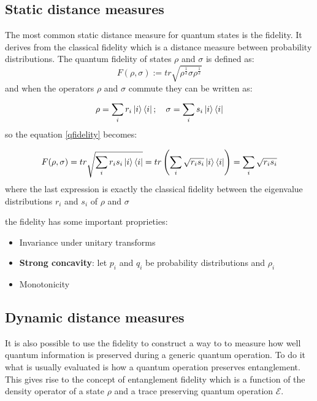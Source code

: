 \documentclass{article}
\begin{document}
\subsection{Static distance measures}


The most common static distance measure for quantum states is the fidelity.
It derives from the classical fidelity which is a distance measure between
probability distributions.
The quantum fidelity of states $\rho$ and $\sigma$ is defined as:
\begin{equation}
	F(\rho,\sigma):=tr \sqrt{\rho^\frac{1}{2}\sigma\rho^\frac{1}{2}}
	\label{qfidelity}
\end{equation}
and when the operators $\rho$ and $\sigma$ commute they can be written as:

\begin {equation}
\rho = \sum_{i} r_i\ket{i}\bra{i}; \hspace{10pt} \sigma = \sum_{i} s_i \ket{i}\bra{i}
\end {equation}
so the equation \ref{qfidelity} becomes:

\begin{equation}
	F(\rho,\sigma) = tr \sqrt{\sum_{i} r_i s_i \ket{i}\bra{i} } = tr \left( \sum_{i} \sqrt{r_i s_i} \ket{i}\bra{i}
	\right) = \sum_{i}\sqrt{r_i s_i}
\end{equation}
where the last expression is exactly the classical fidelity between the eigenvalue
distributions $r_i$ and $s_i$ of $\rho$ and $\sigma$

the fidelity has some important proprieties:
\begin{itemize}
	\item Invariance under unitary transforms
	\item \textbf{Strong concavity}: let $p_i$ and $q_i$ be probability distributions
	      and $\rho_i$
	\item Monotonicity
\end{itemize}
\subsection{Dynamic distance measures}

It is also possible to use the fidelity to construct a way to to measure how
well quantum information is preserved during a generic quantum operation.
To do it what is usually evaluated is how a quantum operation preserves
entanglement.
This gives rise to the concept of entanglement fidelity which is a function
of the density operator of a state $\rho$ and a trace preserving quantum operation
$\mathcal{E}$.
\end{document}
